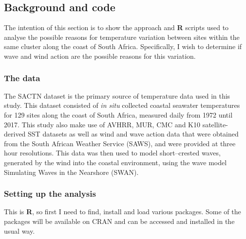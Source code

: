 \documentclass[10pt,a4,]{article}
\begin{document}
\subsection*{Background and code}

The intention of this section is to show the approach and \textbf{R}
scripts used to analyse the possible reasons for temperature variation
between sites within the same cluster along the coast of South Africa.
Specifically, I wish to determine if wave and wind action are the
possible reasons for this variation.

\subsubsection*{The data}

The SACTN dataset is the primary source of temperature data used in this
study. This dataset consisted of \emph{in situ} collected coastal
seawater temperatures for 129 sites along the coast of South Africa,
measured daily from 1972 until 2017. This study also make use of AVHRR,
MUR, CMC and K10 satellite-derived SST datasets as well as wind and wave
action data that were obtained from the South African Weather Service
(SAWS), and were provided at three hour resolutions. This data was then
used to model short--crested waves, generated by the wind into the
coastal environment, using the wave model Simulating Waves in the
Nearshore (SWAN).

\subsubsection*{Setting up the analysis}

This is \textbf{R}, so first I need to find, install and load various
packages. Some of the packages will be available on CRAN and can be
accessed and installed in the usual way.
\end{document}
